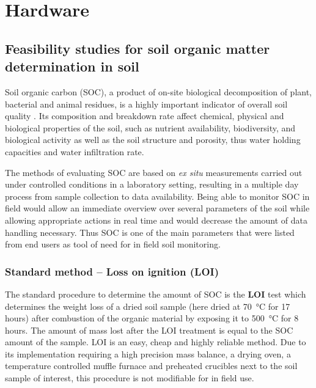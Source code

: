 
\section{Hardware}
\tocless \subsection{Feasibility studies for soil organic matter determination in soil}
Soil organic carbon (\gls{SOC}), a product of on-site biological decomposition of plant, bacterial and animal residues, is a highly important indicator of overall soil quality \cite{Gregorich, Haynes, WanderDrinkwater}. Its composition and breakdown rate affect chemical, physical and biological properties of the soil, such as nutrient availability, biodiversity, and biological activity as well as the soil structure and porosity, thus water holding capacities and water infiltration rate. 

The methods of evaluating \gls{SOC} are based on \textit{ex situ} measurements carried out under controlled conditions in a laboratory setting, resulting in a multiple day process from sample collection to data availability. Being able to monitor \gls{SOC} in field would allow an immediate overview over several parameters of the soil while allowing appropriate actions in real time and would decrease the amount of data handling necessary. Thus \gls{SOC} is one of the main parameters that were listed from end users as tool of need for in field soil monitoring. 

\subsubsection{Standard method -- Loss on ignition (LOI)} \label{StandardmethodsLOI}
The standard procedure to determine the amount of \gls{SOC} is the \textbf{\gls{LOI}} test which determines the weight loss of a dried soil sample (here dried at \SI{70}{\celsius} for 17 hours)  after combustion of the organic material by exposing it to \SI{500}{\celsius} for 8 hours. The amount of mass lost after the \gls{LOI} treatment is equal to the \gls{SOC} amount of the sample. \gls{LOI} is an easy, cheap and highly reliable method. Due to its implementation requiring a high precision mass balance, a drying oven, a temperature controlled muffle furnace and preheated crucibles next to the soil sample of interest, this procedure is not modifiable for in field use. 

